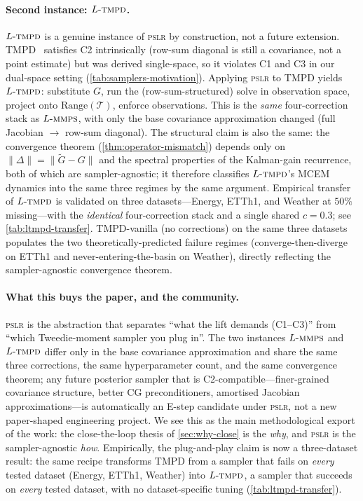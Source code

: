 \documentclass{article}
\theoremstyle{plain}
\theoremstyle{definition}
\theoremstyle{remark}
\newcommand{\tsimg}{\mathcal{T}}
\newcommand{\pslr}{\textsc{pslr}}
\newcommand{\lmmps}{L\mbox{-}\textsc{mmps}}
\newcommand{\ltmpd}{L\mbox{-}\textsc{tmpd}}
\begin{document}
\paragraph{Second instance: $\ltmpd$.}
$\ltmpd$ is a genuine instance of \pslr{} by construction, not a future extension. TMPD~\citep{boys2023tmpd} satisfies C2 intrinsically (row-sum diagonal is still a covariance, not a point estimate) but was derived single-space, so it violates C1 and C3 in our dual-space setting (\cref{tab:samplers-motivation}). Applying \pslr{} to TMPD yields $\ltmpd$: substitute $G$, run the (row-sum-structured) solve in observation space, project onto $\mathrm{Range}(\tsimg)$, enforce observations. This is the \emph{same} four-correction stack as $\lmmps$, with only the base covariance approximation changed (full Jacobian $\to$ row-sum diagonal). The structural claim is also the same: the convergence theorem (\cref{thm:operator-mismatch}) depends only on $\|\Delta\| = \|\tilde{G} - G\|$ and the spectral properties of the Kalman-gain recurrence, both of which are sampler-agnostic; it therefore classifies $\ltmpd$'s MCEM dynamics into the same three regimes by the same argument. Empirical transfer of $\ltmpd$ is validated on three datasets---Energy, ETTh1, and Weather at $50\%$ missing---with the \emph{identical} four-correction stack and a single shared $c = 0.3$; see \cref{tab:ltmpd-transfer}. TMPD-vanilla (no corrections) on the same three datasets populates the two theoretically-predicted failure regimes (converge-then-diverge on ETTh1 and never-entering-the-basin on Weather), directly reflecting the sampler-agnostic convergence theorem.

\paragraph{What this buys the paper, and the community.}
\pslr{} is the abstraction that separates ``what the lift demands (C1--C3)'' from ``which Tweedie-moment sampler you plug in''. The two instances $\lmmps$ and $\ltmpd$ differ only in the base covariance approximation and share the same three corrections, the same hyperparameter count, and the same convergence theorem; any future posterior sampler that is C2-compatible---finer-grained covariance structure, better CG preconditioners, amortised Jacobian approximations---is automatically an E-step candidate under \pslr{}, not a new paper-shaped engineering project. We see this as the main methodological export of the work: the close-the-loop thesis of \cref{sec:why-close} is the \emph{why}, and \pslr{} is the sampler-agnostic \emph{how}. Empirically, the plug-and-play claim is now a three-dataset result: the same recipe transforms TMPD from a sampler that fails on \emph{every} tested dataset (Energy, ETTh1, Weather) into $\ltmpd$, a sampler that succeeds on \emph{every} tested dataset, with no dataset-specific tuning (\cref{tab:ltmpd-transfer}).
\end{document}
